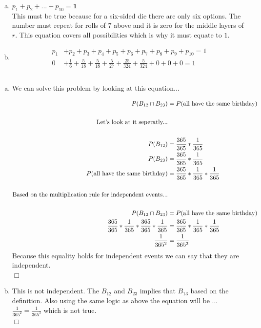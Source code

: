 \documentclass[10pt]{report}
\newenvironment{proof}{\par\noindent{\it Proof.}\hspace*{1em}}{$\Box$\bigskip}
\begin{document}
\begin{enumerate}[(a)]
 \item $p_1 + p_2 + ... + p_10 = \mathbf{1}$ \ \\
 This must be true because for a six-sided die there are only six options. The number must repeat for rolls of 7 above and it is zero for the middle layers of $r $. This equation covers all possibilities which is why it must equate to $1 $. 
 \item 
 \begin{align*}
 p_1 &+ p_2 + p_3 + p_4 + p_5 + p_6 + p_7 + p_8 +p_9 + p_10  = 1\\
 0 &+ \frac{1}{6} + \frac{5}{18} + \frac{5}{18} + \frac{5}{27} + \frac{25}{324} + \frac{5}{324} + 0 + 0 + 0 = 1 
 \end{align*}
 \end{enumerate}
 \setcounter{subsection}{7}
\subsection{}
 \begin{enumerate}[(a)]
 \item We can solve this problem by looking at this equation... 
 \begin{proof}
 \begin{align*}
 P(B_{12} \cap B_{23}) &= P( \textnormal{all have the same birthday}) \\
 \\
 \textnormal{Let's look at it seperatly...} \\
 \\
 P(B_{12}) &= \frac{365}{365} * \frac{1}{365} \\
 P(B_{23}) &= \frac{365}{365} * \frac{1}{365} \\
P( \textnormal{all have the same birthday}) &=\frac{365}{365} * \frac{1}{365} * \frac{1}{365} \\
\\
\textnormal{Based on the multiplication rule for independent events...} \\
\\
 P(B_{12} \cap B_{23}) &= P( \textnormal{all have the same birthday}) \\
  \frac{365}{365} * \frac{1}{365} *  \frac{365}{365} * \frac{1}{365} &=  \frac{365}{365} * \frac{1}{365} * \frac{1}{365} \\
  \frac{1}{365^2} &= \frac{1}{365^2} 
 \end{align*}
 Because this equality holds for independent events we can say that they are independent. \\
 \end{proof}
 \item \begin{proof}
 This is not independent. The $B_{12} $ and $B_{23} $ implies that $B_{13} $ based on the definition. Also using the same logic as above the equation will be ... \\
 $ \frac{1}{365^2} = \frac{1}{365^3} $ which is not true.\ \\
 \end{proof}
 \end{enumerate}
\setcounter{chapter}{2}
\setcounter{section}{0}
\end{document}

